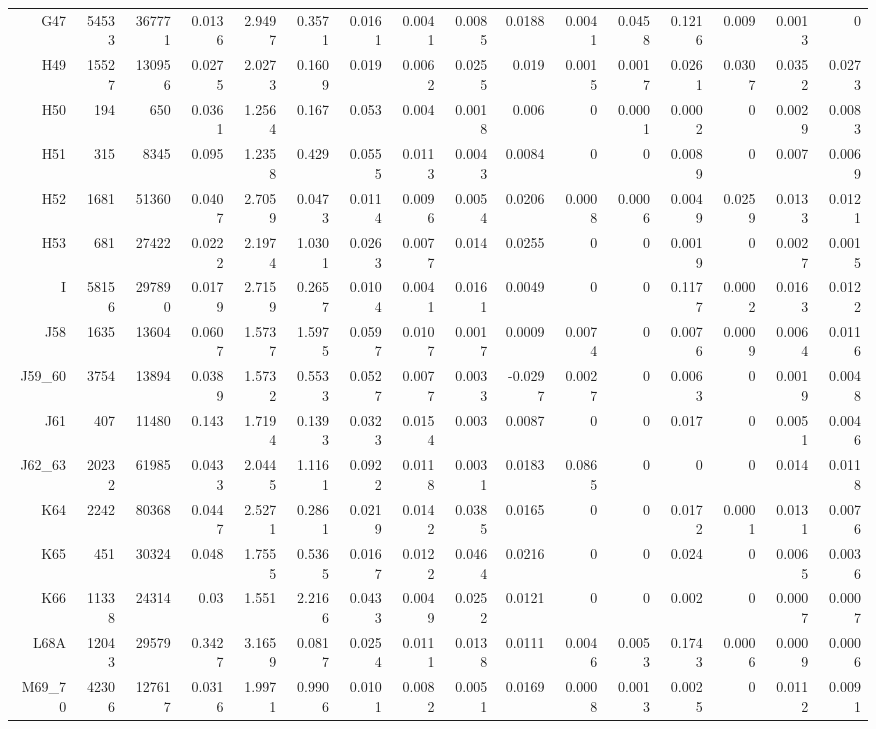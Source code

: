 \begin{table}[!htb]
{\begin{tabular}{rrrrrrrrrrrrrrrr}
G47 & 54533 & 367771 & 0.0136 & 2.9497 & 0.3571 & 0.0161 & 0.0041 & 0.0085 & 0.0188 & 0.0041 & 0.0458 & 0.1216 & 0.009 & 0.0013 & 0 \\
H49 & 15527 & 130956 & 0.0275 & 2.0273 & 0.1609 & 0.019 & 0.0062 & 0.0255 & 0.019 & 0.0015 & 0.0017 & 0.0261 & 0.0307 & 0.0352 & 0.0273 \\
H50 & 194 & 650 & 0.0361 & 1.2564 & 0.167 & 0.053 & 0.004 & 0.0018 & 0.006 & 0 & 0.0001 & 0.0002 & 0 & 0.0029 & 0.0083 \\
H51 & 315 & 8345 & 0.095 & 1.2358 & 0.429 & 0.0555 & 0.0113 & 0.0043 & 0.0084 & 0 & 0 & 0.0089 & 0 & 0.007 & 0.0069 \\
H52 & 1681 & 51360 & 0.0407 & 2.7059 & 0.0473 & 0.0114 & 0.0096 & 0.0054 & 0.0206 & 0.0008 & 0.0006 & 0.0049 & 0.0259 & 0.0133 & 0.0121 \\
H53 & 681 & 27422 & 0.0222 & 2.1974 & 1.0301 & 0.0263 & 0.0077 & 0.014 & 0.0255 & 0 & 0 & 0.0019 & 0 & 0.0027 & 0.0015 \\
I & 58156 & 297890 & 0.0179 & 2.7159 & 0.2657 & 0.0104 & 0.0041 & 0.0161 & 0.0049 & 0 & 0 & 0.1177 & 0.0002 & 0.0163 & 0.0122 \\
J58 & 1635 & 13604 & 0.0607 & 1.5737 & 1.5975 & 0.0597 & 0.0107 & 0.0017 & 0.0009 & 0.0074 & 0 & 0.0076 & 0.0009 & 0.0064 & 0.0116 \\
J59\_60 & 3754 & 13894 & 0.0389 & 1.5732 & 0.5533 & 0.0527 & 0.0077 & 0.0033 & -0.0297 & 0.0027 & 0 & 0.0063 & 0 & 0.0019 & 0.0048 \\
J61 & 407 & 11480 & 0.143 & 1.7194 & 0.1393 & 0.0323 & 0.0154 & 0.003 & 0.0087 & 0 & 0 & 0.017 & 0 & 0.0051 & 0.0046 \\
J62\_63 & 20232 & 61985 & 0.0433 & 2.0445 & 1.1161 & 0.0922 & 0.0118 & 0.0031 & 0.0183 & 0.0865 & 0 & 0 & 0 & 0.014 & 0.0118 \\
K64 & 2242 & 80368 & 0.0447 & 2.5271 & 0.2861 & 0.0219 & 0.0142 & 0.0385 & 0.0165 & 0 & 0 & 0.0172 & 0.0001 & 0.0131 & 0.0076 \\
K65 & 451 & 30324 & 0.048 & 1.7555 & 0.5365 & 0.0167 & 0.0122 & 0.0464 & 0.0216 & 0 & 0 & 0.024 & 0 & 0.0065 & 0.0036 \\
K66 & 11338 & 24314 & 0.03 & 1.551 & 2.2166 & 0.0433 & 0.0049 & 0.0252 & 0.0121 & 0 & 0 & 0.002 & 0 & 0.0007 & 0.0007 \\
L68A & 12043 & 29579 & 0.3427 & 3.1659 & 0.0817 & 0.0254 & 0.0111 & 0.0138 & 0.0111 & 0.0046 & 0.0053 & 0.1743 & 0.0006 & 0.0009 & 0.0006 \\
M69\_70 & 42306 & 127617 & 0.0316 & 1.9971 & 0.9906 & 0.0101 & 0.0082 & 0.0051 & 0.0169 & 0.0008 & 0.0013 & 0.0025 & 0 & 0.0112 & 0.0091 \\

\end{tabular}}
\end{table}
